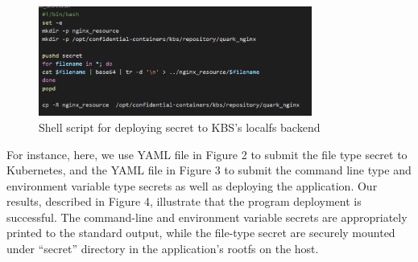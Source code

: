 \begin{figure}[H]
    \centering
    \includegraphics[width=0.8\textwidth]{images/kbs_secret_deployment.png}
    \caption[Shell script for deploying secret to KBS’s localfs backend]{Shell script for deploying secret to KBS’s localfs backend}
    \label{fig:kbs_secret_deployment}
\end{figure}

For instance, here, we use YAML file in Figure 2 to submit the file type secret to Kubernetes, and the YAML file in Figure 3 to submit the command line type and environment variable type secrets as well as deploying the application. Our results, described in Figure 4, illustrate that the program 
deployment is successful.  The command-line and environment variable secrets are appropriately printed to the standard output, while the file-type secret are securely mounted under  “secret” directory in the application’s rootfs on the host. 

